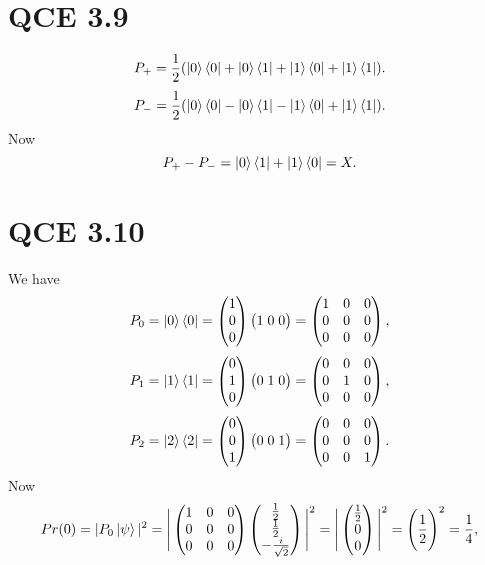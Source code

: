 \documentclass[10pt]{article}
\begin{document}
\section*{QCE 3.9}
\[
P_+ = \frac{1}{2} ( \ket{0} \bra{0} + \ket{0} \bra{1} +\ket{1} \bra{0} +\ket{1} \bra{1}).
\]
\[
P_- = \frac{1}{2} (\ket{0} \bra{0} - \ket{0} \bra{1} -\ket{1} \bra{0} +\ket{1} \bra{1}).
\]
Now 
\[
P_+ - P_- = \ket{0} \bra{1} + \ket{1} \bra{0} = X.
\]

\section*{QCE 3.10}
We have
\[
P_0 = \ket{0} \bra{0} = \begin{pmatrix}
1 \\
0 \\
0
\end{pmatrix} \big( 1 \; 0 \; 0 \big) = \begin{pmatrix}
1 & 0 & 0 \\
0 & 0 & 0 \\
0 & 0 & 0 
\end{pmatrix},
\]
\[
P_1 = \ket{1} \bra{1} = \begin{pmatrix}
0 \\
1 \\
0
\end{pmatrix} \big( 0 \; 1 \; 0 \big) = \begin{pmatrix}
0 & 0 & 0 \\
0 & 1 & 0 \\
0 & 0 & 0 
\end{pmatrix},
\]
\[
P_2 = \ket{2} \bra{2} = \begin{pmatrix}
0 \\
0 \\
1
\end{pmatrix} \big( 0 \; 0 \; 1 \big) = \begin{pmatrix}
0 & 0 & 0 \\
0 & 0 & 0 \\
0 & 0 & 1 
\end{pmatrix}.
\]
Now 
\[
Pr(0) = |P_0 \ket{\psi}|^2 = \Bigg| \begin{pmatrix}
1 & 0 & 0 \\
0 & 0 & 0 \\
0& 0 & 0 
\end{pmatrix} \begin{pmatrix}
\frac{1}{2} \\
\frac{1}{2} \\
-\frac{i}{\sqrt{2}}
\end{pmatrix} \Bigg|^2 = \Bigg| \begin{pmatrix}
\frac{1}{2} \\
0 \\
0
\end{pmatrix} \Bigg|^2 = \Bigg( \frac{1}{2} \Bigg)^2 = \frac{1}{4},
\]
\end{document}
